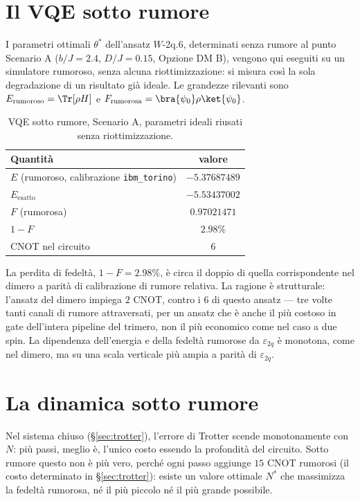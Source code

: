 \documentclass[11pt,a4paper]{article}
\begin{document}
\section{Il VQE sotto rumore}
\label{sec:vqe-rumore}

I parametri ottimali $\theta^*$ dell'ansatz $W$-2q.6, determinati senza
rumore al punto Scenario A ($b/J=2.4$, $D/J=0.15$, Opzione DM B), vengono
qui eseguiti su un simulatore rumoroso, senza alcuna riottimizzazione: si
misura così la sola degradazione di un risultato già ideale. Le
grandezze rilevanti sono $E_\text{rumoroso}=\Tr[\rho H]$ e
$F_\text{rumorosa}=\bra{\psi_0}\rho\ket{\psi_0}$.

\begin{table}[htbp]
\centering
\small
\renewcommand{\arraystretch}{1.3}
\begin{tabular}{@{}lc@{}}
\toprule
\rowcolor{grigetto}
\textbf{Quantità} & \textbf{valore} \\
\midrule
$E$ (rumoroso, calibrazione \texttt{ibm\_torino}) & $-5.37687489$ \\
$E_\text{esatto}$ & $-5.53437002$ \\
$F$ (rumorosa) & $0.97021471$ \\
$1-F$ & $2.98\%$ \\
CNOT nel circuito & $6$ \\
\bottomrule
\end{tabular}
\caption{VQE sotto rumore, Scenario A, parametri ideali riusati senza
riottimizzazione.}
\end{table}
\FloatBarrier

La perdita di fedeltà, $1-F=2.98\%$, è circa il doppio di quella
corrispondente nel dimero a parità di calibrazione di rumore relativa.
La ragione è strutturale: l'ansatz del dimero impiega $2$ CNOT, contro i
$6$ di questo ansatz --- tre volte tanti canali di rumore attraversati,
per un ansatz che è anche il più costoso in gate dell'intera pipeline del
trimero, non il più economico come nel caso a due spin. La dipendenza
dell'energia e della fedeltà rumorose da $\varepsilon_{2q}$ è monotona,
come nel dimero, ma su una scala verticale più ampia a parità di
$\varepsilon_{2q}$.

\section{La dinamica sotto rumore}
\label{sec:dinamica-rumore}

Nel sistema chiuso (\S\ref{sec:trotter}), l'errore di Trotter scende
monotonamente con $N$: più passi, meglio è, l'unico costo essendo la
profondità del circuito. Sotto rumore questo non è più vero, perché ogni
passo aggiunge $15$ CNOT rumorosi (il costo determinato in
\S\ref{sec:trotter}): esiste un valore ottimale $N^*$ che massimizza la
fedeltà rumorosa, né il più piccolo né il più grande possibile.
\end{document}
